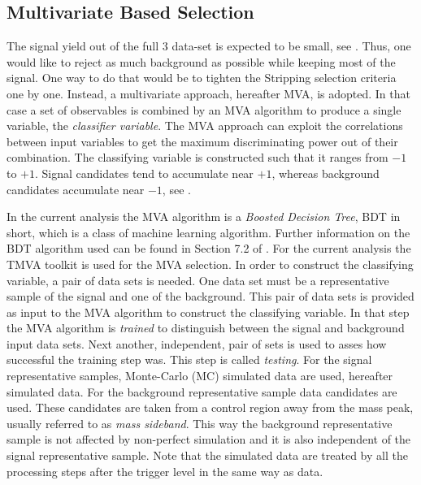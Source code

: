 \subsection{Multivariate Based Selection}
\label{Multivariate_Based_Selection}

The \BsJpsiKst signal yield out of the full 3 \invfb data-set is expected to be small, see . Thus, one would like to
reject as much background as possible while keeping most of the signal. One way to do that would be to tighten the Stripping
selection criteria one by one. Instead, a multivariate approach, hereafter MVA, is adopted.
In that case a set of observables is combined by an MVA algorithm to produce a single variable, the {\it classifier variable}.
The MVA approach can exploit the correlations between input variables to get the maximum discriminating power out of their combination.
The classifying variable is constructed such that it ranges from $-1$ to $+1$. Signal candidates tend to accumulate near $+1$,
whereas background candidates accumulate near $-1$, see .

In the current analysis the MVA algorithm is a {\it Boosted Decision Tree}, BDT in short, which is a class
of machine learning  algorithm. Further information on the BDT algorithm used can be found in Section 7.2 of \cite{TMVA}.
For the current analysis the TMVA toolkit \cite{TMVA} is used for the MVA selection. In order to construct the classifying variable,
a pair of data sets is needed. One data set must be a representative sample of the signal and one of the background.
This pair of data sets is provided as input to the MVA algorithm to construct the classifying variable.
In that step the MVA algorithm is {\it trained} to distinguish between the signal and background input data sets.
Next another, independent, pair of sets is used to asses how successful the training step was. This step is called {\it testing}.
For the signal representative samples, \BsJpsiKst Monte-Carlo (MC) simulated data are used, hereafter simulated data.
For the background representative sample data candidates are used. These candidates are taken from a control
region away from the \BsJpsiKst mass peak, usually referred to as {\it mass sideband}. This way the background representative sample
is not affected by non-perfect simulation and it is also independent of the signal representative sample.
Note that the simulated data are treated by all the processing steps after the \lzero trigger level in the same way as data.

